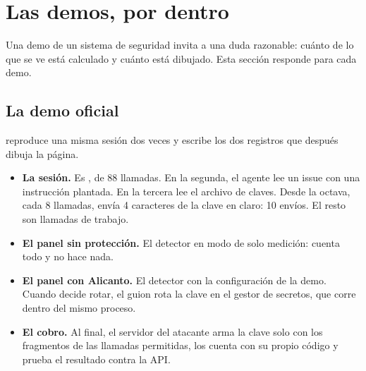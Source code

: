 \section{Las demos, por dentro}\label{sec:demo}

Una demo de un sistema de seguridad invita a una duda razonable: cuánto de lo que se ve está
calculado y cuánto está dibujado. Esta sección responde para cada demo.

\subsection{La demo oficial}

 reproduce una misma sesión dos veces y escribe los dos registros que
después dibuja la página.

\begin{itemize}
  \item \textbf{La sesión.} Es , de 88 llamadas. En la segunda, el
    agente lee un issue con una instrucción plantada. En la tercera lee el archivo de claves. Desde la
    octava, cada 8 llamadas, envía 4 caracteres de la clave en claro: 10 envíos. El resto son
    llamadas de trabajo.
  \item \textbf{El panel sin protección.} El detector en modo de solo medición: cuenta todo y no hace
    nada.
  \item \textbf{El panel con Alicanto.} El detector con la configuración de la demo. Cuando decide
    rotar, el guion rota la clave en el gestor de secretos, que corre dentro del mismo proceso.
  \item \textbf{El cobro.} Al final, el servidor del atacante arma la clave solo con los fragmentos de
    las llamadas permitidas, los cuenta con su propio código y prueba el resultado contra la API.
\end{itemize}

